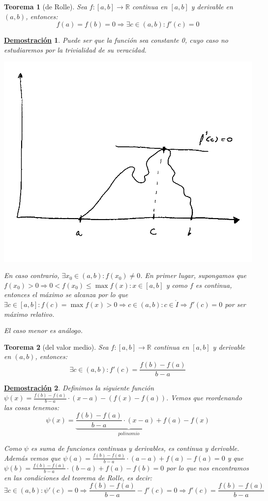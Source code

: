 \documentclass[10pt,a4paper,openright]{book}
\theoremstyle{break}
\newtheorem{theo}{Teorema}[chapter]
\newtheorem*{demo}{\underline{Demostración}}
\begin{document}
\begin{theo}[de Rolle]
Sea $f: [a,b]\rightarrow \mathbb R$ continua en $[a,b]$ y derivable en $(a,b)$, entonces:
$$f(a)=f(b)=0\Rightarrow \exists c\in (a,b): f'(c)=0$$
\end{theo}
\begin{demo}
Puede ser que la función sea constante 0, cuyo caso no estudiaremos por la trivialidad de su veracidad.
\begin{center}
\includegraphics[scale=0.90]{Teorema de Rolle}
\end{center}
En caso contrario, $\exists x_0\in (a,b):f(x_0)\neq 0$. En primer lugar, supongamos que $f(x_0)>0\Rightarrow 0<f(x_0)\leq \max{f(x)}: x\in [a,b]$ y como $f$ es continua, entonces el máximo se alcanza por lo que $\exists c\in [a,b]: f(c)=\max{f(x)}>0\Rightarrow c\in (a,b): c\in \mathring{I}\Rightarrow f'(c) = 0$ por ser máximo relativo.

El caso menor es análogo.
\end{demo}

\begin{theo}[del valor medio]
Sea $f:[a,b]\rightarrow\mathbb R$ continua en $[a,b]$ y derivable en $(a,b)$, entonces:
$$\exists c \in (a,b): f'(c)=\frac{f(b)-f(a)}{b-a}$$
\end{theo}
\begin{demo}
Definimos la siguiente función $\psi(x)=\frac{f(b)-f(a)}{b-a}\cdot (x-a)-(f(x)-f(a))$. Vemos que reordenando las cosas tenemos:
$$\psi(x)=\underbrace{\frac{f(b)-f(a)}{b-a}\cdot (x-a)+f(a)}_{polinomio}-f(x)$$

Como $\psi$ es suma de funciones continuas y derivables, es continua y derivable. Además vemos que $\psi(a)=\frac{f(b)-f(a)}{b-a}\cdot (a-a)+f(a)-f(a)=0$ y que $\psi(b)=\frac{f(b)-f(a)}{b-a}\cdot (b-a)+f(a)-f(b)=0$ por lo que nos encontramos en las condiciones del teorema de Rolle, es decir:
$$\exists c\in (a,b): \psi'(c)=0\Rightarrow \frac{f(b)-f(a)}{b-a}-f'(c)=0\Rightarrow f'(c)=\frac{f(b)-f(a)}{b-a}$$
\end{demo}
\end{document}
